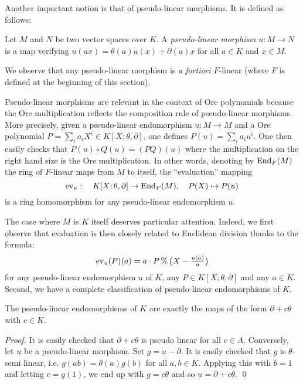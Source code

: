 \documentclass[a4paper]{llncs}
\newcommand{\End}{\textrm{\rm End}}
\newcommand{\ev}[1]{\textrm{\rm ev}_{#1}}
\renewcommand{\mod}{\,\%\,}
\begin{document}
Another important notion is that of pseudo-linear morphisms. It is 
defined as follows:

\begin{definition}
Let $M$ and $N$ be two vector spaces over $K$.
A \emph{pseudo-linear morphism} $u : M\to N$ is a map verifying 
$u(ax) = \theta(a)u(x) + \partial(a)x$ for all $a \in K$ and $x \in M$.
\end{definition}

We observe that any pseudo-linear morphism is \emph{a fortiori}
$F$-linear (where $F$ is defined at the beginning of this section).

Pseudo-linear morphisms are relevant in the context of Ore polynomials 
because the Ore multiplication reflects the composition rule of 
pseudo-linear morphisms. More precisely, given a pseudo-linear 
endomorphism $u : M \to M$ and a Ore polynomial $P = \sum_i a_i X^i \in 
K[X;\theta,\partial]$, one defines $P(u) = \sum_i a_i u^i$. One then 
easily checks that $P(u) \circ Q(u) = (PQ)(u)$ where the multiplication 
on the right hand size is the Ore multiplication. In other words, 
denoting by $\End_F(M)$ the ring of $F$-linear maps from $M$ to itself, 
the ``evaluation'' mapping
$$\ev{u} : \quad K[X;\theta,\partial] \to \End_F(M), \quad
P(X) \mapsto P(u)$$
is a ring homomorphism for any pseudo-linear endomorphism $u$.

The case where $M$ is $K$ itself deserves particular attention.
Indeed, we first observe that evaluation is then closely related to
Euclidean division thanks to the formula:
\begin{equation}
\label{eq:evanddiv}
\textstyle \ev{u}(P)(a) = 
a \cdot P \mod \big(X - \frac{u(a)}{a}\big)
\end{equation}
for any pseudo-linear endomorphism $u$ of $K$, any $P \in K[X;\theta,
\partial]$ and any $a \in K$. Second, we have a complete classification
of pseudo-linear endomorphisms of $K$.

\begin{proposition}
The pseudo-linear endomorphisms of $K$ are exactly the maps of
the form $\partial + c\theta$ with $c \in K$.
\end{proposition}

\begin{proof}
It is easily checked that $\partial + c\theta$ is pseudo linear
for all $c\in A$. Conversely, let $u$ be a pseudo-linear morphism.
Set $g = u - \partial$. It is easily checked that $g$ is 
$\theta$-semi linear, i.e. $g(ab) = \theta(a) g(b)$ for all $a, b 
\in K$. Applying this with $b = 1$ and letting $c = g(1)$, we end
up with $g = c \theta$ and so $u = \partial + c\theta$. \qed
\end{proof}
\end{document}
